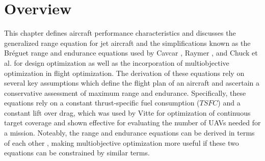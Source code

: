 \section{Overview}
\hspace{0.5cm} This chapter defines aircraft performance characteristics and discusses the generalized range equation for jet aircraft and the simplifications known as the Br\'eguet range and endurance equations used by  Cavcar \cite{breguetRangeEqn}, Raymer \cite{LoiterTimeFromRange}, and Chuck et al. \cite{fuelsLOGRange} for design optimization as well as the incorporation of multiobjective optimization in flight optimization. The derivation of these equations rely on several key assumptions which define the flight plan of an aircraft and ascertain a conservative assessment of maximum range and endurance. Specifically, these equations rely on a constant thrust-specific fuel consumption ($TSFC$) and a constant lift over drag, which was used by Vitte \cite{OptimizeBreguet} for optimization of continuous target coverage and shown effective for evaluating the number of UAVs needed for a mission. Noteably, the range and endurance equations can be derived in terms of each other \cite{LoiterTimeFromRange}, making multiobjective optimization more useful if these two equations can be constrained by similar terms. 
